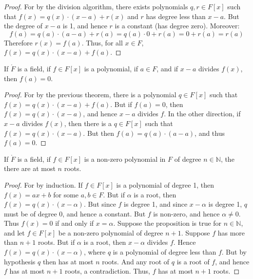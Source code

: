 \documentclass{article}                                                        %
\begin{document}
        \begin{proof}
            For by the division algorithm, there exists polynomials
            $q,r\in{F}[x]$ such that $f(x)=q(x)\cdot(x-a)+r(x)$ and $r$ has
            degree less than $x-a$. But the degree of $x-a$ is 1, and hence
            $r$ is a constant (has degree zero). Moreover:
            \begin{equation}
                f(a)=q(a)\cdot(a-a)+r(a)=q(a)\cdot{0}+r(a)=0+r(a)=r(a)
            \end{equation}
            Therefore $r(x)=f(a)$. Thus, for all $x\in{F}$,
            $f(x)=q(x)\cdot(x-a)+f(a)$.
        \end{proof}
        \begin{theorem}
            If $\ring{F}$ is a field, if $f\in{F}[x]$ is a polynomial, if
            $a\in{F}$, and if $x-a$ divides $f(x)$, then $f(a)=0$.
        \end{theorem}
        \begin{proof}
            For by the previous theorem, there is a polynomial $q\in{F}[x]$
            such that $f(x)=q(x)\cdot(x-a)+f(a)$. But if $f(a)=0$, then
            $f(x)=q(x)\cdot(x-a)$, and hence $x-a$ divides $f$. In the other
            direction, if $x-a$ divides $f(x)$, then there is a $q\in{F}[x]$
            such that $f(x)=q(x)\cdot(x-a)$. But then $f(a)=q(a)\cdot(a-a)$,
            and thus $f(a)=0$.
        \end{proof}
        \begin{theorem}
            If $\ring{F}$ is a field, if $f\in{F}[x]$ is a non-zero polynomial
            in $F$ of degree $n\in\mathbb{N}$, the there are at most $n$ roots.
        \end{theorem}
        \begin{proof}
            For by induction. If $f\in{F}[x]$ is a polynomial of degree 1, then
            $f(x)=ax+b$ for some $a,b\in{F}$. But if $\alpha$ is a root, then
            $f(x)=q(x)\cdot(x-\alpha)$. But since $f$ is degree 1, and since
            $x-\alpha$ is degree 1, $q$ must be of degree 0, and hence a
            constant. But $f$ is non-zero, and hence $\alpha\ne{0}$. Thus
            $f(x)=0$ if and only if $x=\alpha$. Suppose the proposition is true
            for $n\in\mathbb{N}$, and let $f\in{F}[x]$ be a non-zero polynomial
            of degree $n+1$. Suppose $f$ has more than $n+1$ roots. But if
            $\alpha$ is a root, then $x-\alpha$ divides $f$. Hence
            $f(x)=q(x)\cdot(x-\alpha)$, where $q$ is a polynomial of degree less
            than $f$. But by hypothesis $q$ then has at most $n$ roots. And any
            root of $q$ is a root of $f$, and hence $f$ has at most $n+1$ roots,
            a contradiction. Thus, $f$ has at most $n+1$ roots.
        \end{proof}
\end{document}
